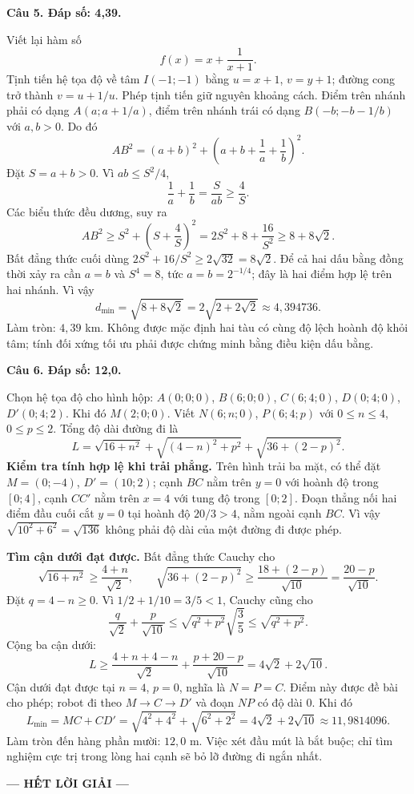 \documentclass[12pt,a4paper]{article}
\newcommand{\loigiai}[1]{\par\medskip\Needspace{4\baselineskip}\noindent\textbf{#1}\par\nobreak}
\begin{document}
\loigiai{Câu 5. Đáp số: 4,39.}
Viết lại hàm số
\[f(x)=x+\frac1{x+1}.\]
Tịnh tiến hệ tọa độ về tâm $I(-1;-1)$ bằng $u=x+1$, $v=y+1$; đường cong trở thành $v=u+1/u$. Phép tịnh tiến giữ nguyên khoảng cách.
Điểm trên nhánh phải có dạng $A(a;a+1/a)$, điểm trên nhánh trái có dạng $B(-b;-b-1/b)$ với $a,b>0$. Do đó
\[AB^2=(a+b)^2+\left(a+b+\frac1a+\frac1b\right)^2.\]
Đặt $S=a+b>0$. Vì $ab\leq S^2/4$,
\[\frac1a+\frac1b=\frac S{ab}\geq\frac4S.\]
Các biểu thức đều dương, suy ra
\[AB^2\geq S^2+\left(S+\frac4S\right)^2
=2S^2+8+\frac{16}{S^2}\geq8+8\sqrt2.\]
Bất đẳng thức cuối dùng $2S^2+16/S^2\geq2\sqrt{32}=8\sqrt2$. Để cả hai dấu bằng đồng thời xảy ra cần $a=b$ và $S^4=8$, tức $a=b=2^{-1/4}$; đây là hai điểm hợp lệ trên hai nhánh.
Vì vậy
\[d_{\min}=\sqrt{8+8\sqrt2}=2\sqrt{2+2\sqrt2}\approx4{,}394736.\]
Làm tròn: $4{,}39$ km. Không được mặc định hai tàu có cùng độ lệch hoành độ khỏi tâm; tính đối xứng tối ưu phải được chứng minh bằng điều kiện dấu bằng.

\loigiai{Câu 6. Đáp số: 12,0.}
Chọn hệ tọa độ cho hình hộp: $A(0;0;0)$, $B(6;0;0)$, $C(6;4;0)$, $D(0;4;0)$, $D'(0;4;2)$. Khi đó $M(2;0;0)$.
Viết $N(6;n;0)$, $P(6;4;p)$ với $0\leq n\leq4$, $0\leq p\leq2$. Tổng độ dài đường đi là
\[L=\sqrt{16+n^2}+\sqrt{(4-n)^2+p^2}+\sqrt{36+(2-p)^2}.\]
\textbf{Kiểm tra tính hợp lệ khi trải phẳng.} Trên hình trải ba mặt, có thể đặt $M=(0;-4)$, $D'=(10;2)$; cạnh $BC$ nằm trên $y=0$ với hoành độ trong $[0;4]$, cạnh $CC'$ nằm trên $x=4$ với tung độ trong $[0;2]$. Đoạn thẳng nối hai điểm đầu cuối cắt $y=0$ tại hoành độ $20/3>4$, nằm ngoài cạnh $BC$. Vì vậy $\sqrt{10^2+6^2}=\sqrt{136}$ không phải độ dài của một đường đi được phép.

\textbf{Tìm cận dưới đạt được.} Bất đẳng thức Cauchy cho
\[\sqrt{16+n^2}\geq\frac{4+n}{\sqrt2},\qquad
\sqrt{36+(2-p)^2}\geq\frac{18+(2-p)}{\sqrt{10}}=\frac{20-p}{\sqrt{10}}.\]
Đặt $q=4-n\geq0$. Vì $1/2+1/10=3/5<1$, Cauchy cũng cho
\[\frac q{\sqrt2}+\frac p{\sqrt{10}}
\leq\sqrt{q^2+p^2}\sqrt{\frac35}\leq\sqrt{q^2+p^2}.\]
Cộng ba cận dưới:
\[L\geq\frac{4+n+4-n}{\sqrt2}+\frac{p+20-p}{\sqrt{10}}
=4\sqrt2+2\sqrt{10}.\]
Cận dưới đạt được tại $n=4$, $p=0$, nghĩa là $N=P=C$. Điểm này được đề bài cho phép; robot đi theo $M\to C\to D'$ và đoạn $NP$ có độ dài $0$. Khi đó
\[L_{\min}=MC+CD'=\sqrt{4^2+4^2}+\sqrt{6^2+2^2}
=4\sqrt2+2\sqrt{10}\approx11{,}9814096.\]
Làm tròn đến hàng phần mười: $12{,}0$ m. Việc xét đầu mút là bắt buộc; chỉ tìm nghiệm cực trị trong lòng hai cạnh sẽ bỏ lỡ đường đi ngắn nhất.
\begin{center}\textbf{--- HẾT LỜI GIẢI ---}\end{center}
\end{document}
